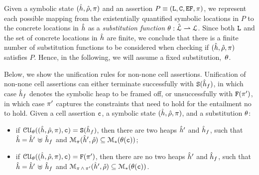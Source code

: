 \vspace{-10pt}
Given a symbolic state $(\sheap, \sstore, \pc)$ and an assertion $P \equiv (\existentials, \cells, \efs, \pfs)$, 
we represent each possible mapping from the existentially quantified symbolic locations in $P$ 
to the concrete locations in $\sheap$ as a \emph{substitution function} $\subst : \slocs \rightharpoonup \locs$.
Since both $\existentials$ and the set of concrete locations in $\sheap$ 
are finite, we conclude that there is a finite number of substitution functions to be considered 
when checking if $(\sheap, \sstore, \pc)$ satisfies $P$. 
%
Hence, in the following, we will assume a fixed substitution,~$\subst$. 

Below, we show the unification rules for non-none cell assertions. 
Unification of non-none cell assertions can either terminate
successfully with $\uyes{\sheap_f}$, in which case $\sheap_f$ denotes the
symbolic heap to be framed off, or unsuccessfully with $\uno{\pc'}$, 
in which case $\pc'$ captures the constraints that need to hold for 
the entailment no to hold.
Given a cell assertion $\cell$, a symbolic state $(\sheap, \sstore, \pc)$, 
and a substitution $\subst$: 
\begin{itemize}
    \item if $\unification{\sheap, \sstore, \pc}{\cell}{\subst} = \uyes{\sheap_f}$, then there are 
            two heaps $\sheap'$ and $\sheap_f$, such that $\sheap = \sheap' \dunion \sheap_f$
            and $\smodels{\sheap', \sstore}{\pc} \subseteq \sepmodels{\subst(\cell)}$; 
   
   \item if $\unification{\sheap, \sstore, \pc}{\cell}{\subst} = \uno{\pc'}$, then there are 
            no two heaps $\sheap'$ and $\sheap_f$, such that $\sheap = \sheap' \dunion \sheap_f$ 
            and $\smodels{\sheap', \sstore}{\pc \, \wedge \, \pc'} \subseteq \sepmodels{\subst(\cell)}$.
\end{itemize}



